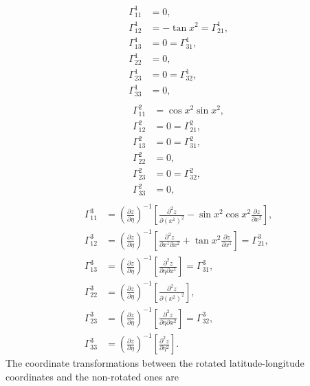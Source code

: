 \documentclass{article}
\begin{document}
\begin{align}
\Gamma^1_{11}&=0, \\
\Gamma^1_{12}&=-\tan x^2=\Gamma^1_{21}, \\
\Gamma^1_{13}&=0=\Gamma^1_{31}, \\
\Gamma^1_{22}&=0, \\
\Gamma^1_{23}&=0=\Gamma^1_{32}, \\
\Gamma^1_{33}&=0, \\
\end{align}
\begin{align}
\Gamma^2_{11}&=\cos x^2 \sin x^2, \\
\Gamma^2_{12}&=0=\Gamma^2_{21}, \\
\Gamma^2_{13}&=0=\Gamma^2_{31}, \\
\Gamma^2_{22}&=0, \\
\Gamma^2_{23}&=0=\Gamma^2_{32}, \\
\Gamma^2_{33}&=0, \\
\end{align}
\begin{align}
\Gamma^3_{11}&=\left( \frac{\partial z}{\partial \eta} \right)^{-1} \left[ \frac{\partial^2 z}{\partial (x^1)^2} - \sin x^2\cos x^2 \frac{\partial z}{\partial x^2} \right], \\
\Gamma^3_{12}&=\left( \frac{\partial z}{\partial \eta} \right)^{-1} \left[ \frac{\partial^2 z}{\partial x^1 \partial x^2} + \tan x^2 \frac{\partial z}{\partial x^1} \right]=\Gamma^3_{21}, \\
\Gamma^3_{13}&=\left( \frac{\partial z}{\partial \eta} \right)^{-1} \left[ \frac{\partial^2 z}{\partial \eta \partial x^1} \right]=\Gamma^3_{31}, \\
\Gamma^3_{22}&=\left( \frac{\partial z}{\partial \eta} \right)^{-1} \left[ \frac{\partial^2 z}{\partial (x^2)^2} \right], \\
\Gamma^3_{23}&=\left( \frac{\partial z}{\partial \eta} \right)^{-1} \left[ \frac{\partial^2 z}{\partial \eta \partial x^2} \right]=\Gamma^3_{32}, \\
\Gamma^3_{33}&=\left( \frac{\partial z}{\partial \eta} \right)^{-1} \left[ \frac{\partial^2 z}{\partial \eta^2} \right].
\end{align}
The coordinate transformations between the rotated latitude-longitude coordinates and the non-rotated ones are
\end{document}
